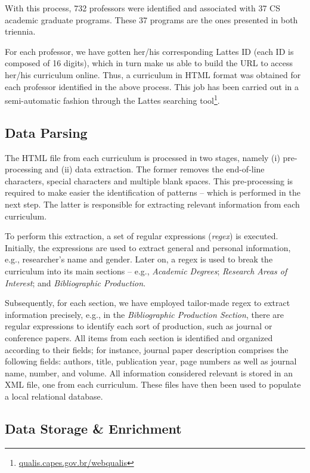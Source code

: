 \documentclass[10pt]{article}
\begin{document}
With this process, 732 professors were identified and
associated with 37 CS academic graduate programs. These 37 programs are the ones presented in both triennia.

For each professor, we have gotten her/his corresponding Lattes ID (each ID is composed of 16 digits), which in turn make us
able to build the URL to access her/his curriculum online. Thus, a curriculum in HTML format was
obtained for each professor identified in the above process. This job has been carried out in a semi-automatic fashion through
the Lattes searching tool\footnote{\url{qualis.capes.gov.br/webqualis}}.

\subsection*{Data Parsing}

The HTML file from each curriculum is processed in two stages, namely (i) pre-processing and (ii) data extraction.  The
former removes the end-of-line characters, special characters and multiple blank spaces. This pre-processing is required to
make easier the identification of patterns -- which is performed in the next step. The latter is responsible for extracting
relevant information from each curriculum. 

To perform this extraction, a set of regular expressions ({\em regex}) is executed.  Initially, the expressions are used to
extract general and personal information, e.g., researcher's name and gender.  Later on, a regex is used to break the
curriculum into its main sections -- e.g., {\em Academic Degrees}; {\em Research Areas of Interest}; and {\em Bibliographic
Production}. 

Subsequently, for each section, we have employed tailor-made regex to extract information precisely, e.g., in the {\em Bibliographic Production Section}, there are regular expressions to identify each sort of production, such as journal or conference papers.
All items from each section is identified and organized according to their fields; for instance, journal
paper description comprises the following fields: authors, title, publication year, page numbers as well as journal name,
number, and volume. All information considered relevant is stored in an XML file, one from each curriculum. These files have
then been used to populate a local relational database.


\subsection*{Data Storage \& Enrichment}
\label{sec:enrich}
\end{document}
